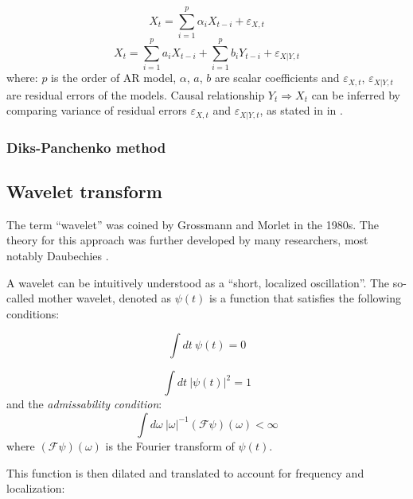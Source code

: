 \begin{equation}
X_t = \sum_{i=1}^{p} \alpha_i X_{t-i} + \varepsilon_{X,t}
\end{equation}
\begin{equation}
X_t = \sum_{i=1}^{p} a_i X_{t-i} + \sum_{i=1}^{p} b_i Y_{t-i} + \varepsilon_{X|Y,t}
\end{equation}
where: $p$ is the order of AR model, $\alpha$, $a$, $b$ are scalar coefficients and $\varepsilon_{X,t}$, $\varepsilon_{X|Y,t}$ are residual errors of the models.
Causal relationship $Y_t \Rightarrow X_t$ can be inferred by comparing variance of residual errors $\varepsilon_{X,t}$ and $\varepsilon_{X|Y,t}$, as stated in  in .

\subsubsection{Diks-Panchenko method}
\cite{diks-panchenko2004}
\cite{hiemstra-jones}
\cite{baek-brock1992}

\subsection{Wavelet transform} \label{sec:wavelet}
The term ``wavelet'' was coined by Grossmann and Morlet \cite{grossmann-morlet}  in the 1980s. 
The theory for this approach was further developed by many researchers, most notably Daubechies \cite{daubechies1990}.

A wavelet can be intuitively understood as a ``short, localized oscillation''.
The so-called mother wavelet, denoted as $\psi(t)$ is a function that satisfies the following conditions:

\begin{equation} \label{eq:wavelet-zero-mean}
	\int\! dt \: \psi (t) = 0
\end{equation}

\begin{equation} \label{eq:wavelet-norm}
	\int\! dt \: |\psi (t)|^2 = 1
\end{equation}
and the \emph{admissability condition}:
\begin{equation}
	\int\! d\omega \: |\omega|^{-1} \left(\mathscr{F} \psi\right)(\omega) < \infty
\end{equation}
where $\left(\mathscr{F} \psi\right)(\omega)$ is the Fourier transform of $\psi(t)$.

This function is then dilated and translated to account for frequency and localization:

